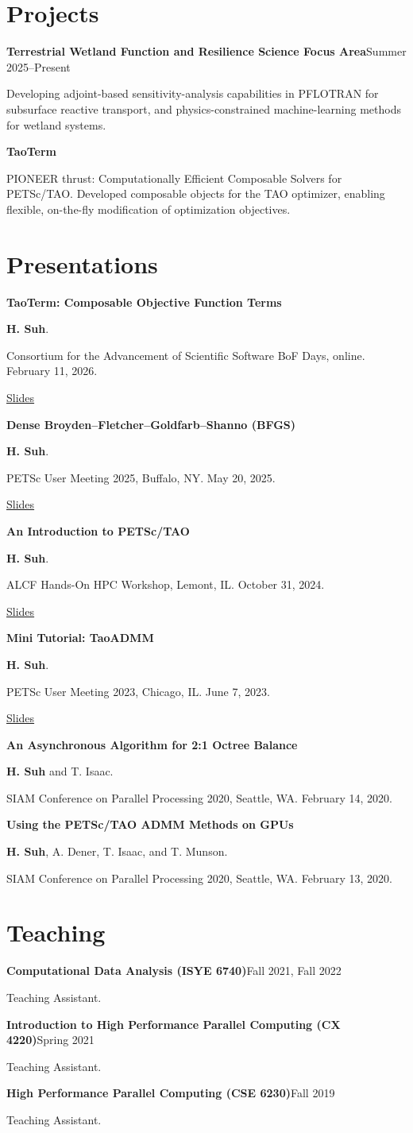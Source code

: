 \documentclass[10pt,letterpaper]{article}
\newcommand{\entry}[2]{\par\textbf{#1}\hfill #2\par}
\newcommand{\paper}[3]{\par\textbf{#1}\par #2\par #3\par}
\begin{document}
\section{Projects}
\entry{Terrestrial Wetland Function and Resilience Science Focus Area}{Summer 2025--Present}
Developing adjoint-based sensitivity-analysis capabilities in PFLOTRAN for subsurface reactive transport, and physics-constrained machine-learning methods for wetland systems.
\par\textbf{TaoTerm}\par
PIONEER thrust: Computationally Efficient Composable Solvers for PETSc/TAO.
Developed composable objects for the TAO optimizer, enabling flexible, on-the-fly modification of optimization objectives.

\newpage
\section{Presentations}
\paper{TaoTerm: Composable Objective Function Terms}{\textbf{H. Suh}.}
{Consortium for the Advancement of Scientific Software BoF Days, online. February 11, 2026.\par
\href{https://hansolsuh.com/assets/taoterm_2026_bof_cass-4.pdf}{Slides}}
\paper{Dense Broyden--Fletcher--Goldfarb--Shanno (BFGS)}{\textbf{H. Suh}.}
{PETSc User Meeting 2025, Buffalo, NY. May 20, 2025.\par
\href{https://hansolsuh.com/assets/petsc2025_bfgs_slides.pdf}{Slides}}
\paper{An Introduction to PETSc/TAO}{\textbf{H. Suh}.}
{ALCF Hands-On HPC Workshop, Lemont, IL. October 31, 2024.\par
\href{https://hansolsuh.com/assets/alcf_workshop_2024_petsc.pdf}{Slides}}
\paper{Mini Tutorial: TaoADMM}{\textbf{H. Suh}.}
{PETSc User Meeting 2023, Chicago, IL. June 7, 2023.\par
\href{https://hansolsuh.com/assets/taoadmm.pdf}{Slides}}
\paper{An Asynchronous Algorithm for 2:1 Octree Balance}{\textbf{H. Suh} and T. Isaac.}
{SIAM Conference on Parallel Processing 2020, Seattle, WA. February 14, 2020.}
\paper{Using the PETSc/TAO ADMM Methods on GPUs}{\textbf{H. Suh}, A. Dener, T. Isaac, and T. Munson.}
{SIAM Conference on Parallel Processing 2020, Seattle, WA. February 13, 2020.}

\section{Teaching}
\entry{Computational Data Analysis (ISYE 6740)}{Fall 2021, Fall 2022}
Teaching Assistant.
\entry{Introduction to High Performance Parallel Computing (CX 4220)}{Spring 2021}
Teaching Assistant.
\entry{High Performance Parallel Computing (CSE 6230)}{Fall 2019}
Teaching Assistant.
\end{document}
